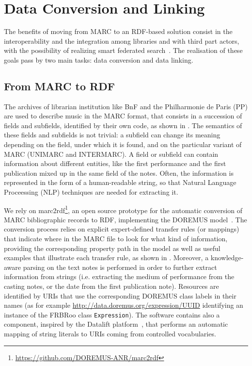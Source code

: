 \documentclass{article}
\begin{document}
\section{Data Conversion and Linking}
\label{sec:conversion-linking}
The benefits of moving from MARC to an RDF-based solution consist in the interoperability and the integration among libraries and with third part actors, with the possibility of realizing smart federated search~\cite{byrne2010strongest}. The realisation of these goals pass by two main tasks: data conversion and data linking.

\subsection{From MARC to RDF}
The archives of librarian institution like BnF and the Philharmonie de Paris (PP) are used to describe music in the MARC format, that consists in a succession of fields and subfields, identified by their own code, as shown in . The semantics of these fields and subfields is not trivial: a subfield can change its meaning depending on the field, under which it is found, and on the particular variant of MARC (UNIMARC and INTERMARC). A field or subfield can contain information about different entities, like the first performance and the first publication mixed up in the same field of the notes. Often, the information is represented in the form of a human-readable string, so that Natural Language Proceessing (NLP) techniques are needed for extracting it.

We rely on {\smallsc marc2rdf}\footnote{\url{https://github.com/DOREMUS-ANR/marc2rdf}}, an open source prototype for the automatic conversion of MARC bibliographic records to RDF, implementing the DOREMUS model~\cite{lisena2016exploring}. The conversion process relies on explicit expert-defined transfer rules (or mappings) that indicate where in the MARC file to look for what kind of information, providing the corresponding property path in the model as well as useful examples that illustrate each transfer rule, as shown in . Moreover, a knowledge-aware parsing on the text notes is performed in order to further extract information from strings (i.e. extracting the medium of performance from the casting notes, or the date from the first publication note). Resources are identified by URIs that use the corresponding DOREMUS class labels in their names (as for example \url{http://data.doremus.org/expression/UUID} identifying an instance of the FRBRoo class \texttt{Expression}). The software contains also a  component, inspired by the Datalift platform~\cite{scharffe2012enabling}, that performs an automatic mapping of string literals to URIs coming from controlled vocabularies.
\end{document}

